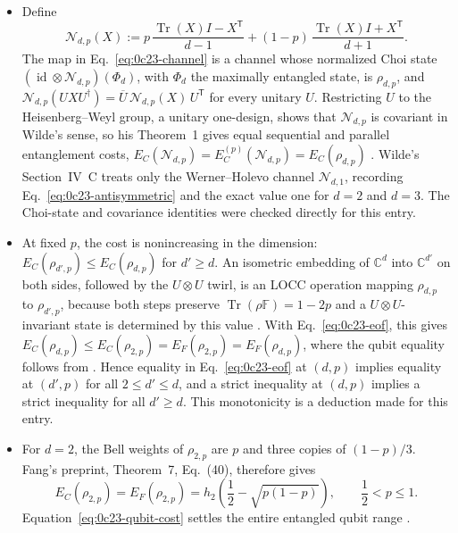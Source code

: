 \begin{itemize}
  \item Define
  \begin{equation}
    \mathcal N_{d,p}(X):=p\,\frac{\operatorname{Tr}(X)I-X^{\mathsf T}}{d-1}
      +(1-p)\,\frac{\operatorname{Tr}(X)I+X^{\mathsf T}}{d+1}.
    \label{eq:0c23-channel}
  \end{equation}
  The map in Eq.~\eqref{eq:0c23-channel} is a channel whose normalized Choi
  state $(\operatorname{id}\otimes\mathcal N_{d,p})(\Phi_d)$, with $\Phi_d$ the
  maximally entangled state, is $\rho_{d,p}$, and
  $\mathcal N_{d,p}(UXU^\dagger)=\overline U\,\mathcal N_{d,p}(X)\,U^{\mathsf T}$
  for every unitary $U$.  Restricting $U$ to the Heisenberg--Weyl group, a
  unitary one-design, shows that $\mathcal N_{d,p}$ is covariant in Wilde's
  sense, so his Theorem~1 gives equal sequential and parallel entanglement
  costs, $E_C(\mathcal N_{d,p})=E_C^{(p)}(\mathcal N_{d,p})=E_C(\rho_{d,p})$
  .  Wilde's Section~IV~C treats only the
  Werner--Holevo channel $\mathcal N_{d,1}$, recording
  Eq.~\eqref{eq:0c23-antisymmetric} and the exact value one for $d=2$ and
  $d=3$.  The Choi-state and covariance identities were checked directly for
  this entry.

  \item At fixed $p$, the cost is nonincreasing in the dimension:
  $E_C(\rho_{d',p})\leq E_C(\rho_{d,p})$ for $d'\geq d$.  An isometric embedding
  of $\mathbb C^d$ into $\mathbb C^{d'}$ on both sides, followed by the
  $U\otimes U$ twirl, is an LOCC operation mapping $\rho_{d,p}$ to
  $\rho_{d',p}$, because both steps preserve
  $\operatorname{Tr}(\rho\mathbb F)=1-2p$ and a $U\otimes U$-invariant state is
  determined by this value .  With
  Eq.~\eqref{eq:0c23-eof}, this gives
  $E_C(\rho_{d,p})\leq E_C(\rho_{2,p})=E_F(\rho_{2,p})=E_F(\rho_{d,p})$,
  where the qubit equality follows from .
  Hence equality in Eq.~\eqref{eq:0c23-eof} at $(d,p)$ implies equality at
  $(d',p)$ for all $2\leq d'\leq d$, and a strict inequality at $(d,p)$ implies
  a strict inequality for all $d'\geq d$.  This monotonicity is a deduction made for
  this entry.

  \item For $d=2$, the Bell weights of $\rho_{2,p}$ are $p$ and three copies
  of $(1-p)/3$.  Fang's preprint, Theorem~7, Eq.~(40), therefore gives
  \begin{equation}
    E_C(\rho_{2,p})=E_F(\rho_{2,p})
      =h_2\!\left(\frac12-\sqrt{p(1-p)}\right),
    \qquad \frac12<p\leq1.
    \label{eq:0c23-qubit-cost}
  \end{equation}
  Equation~\eqref{eq:0c23-qubit-cost} settles the entire entangled qubit range
  .
\end{itemize}


